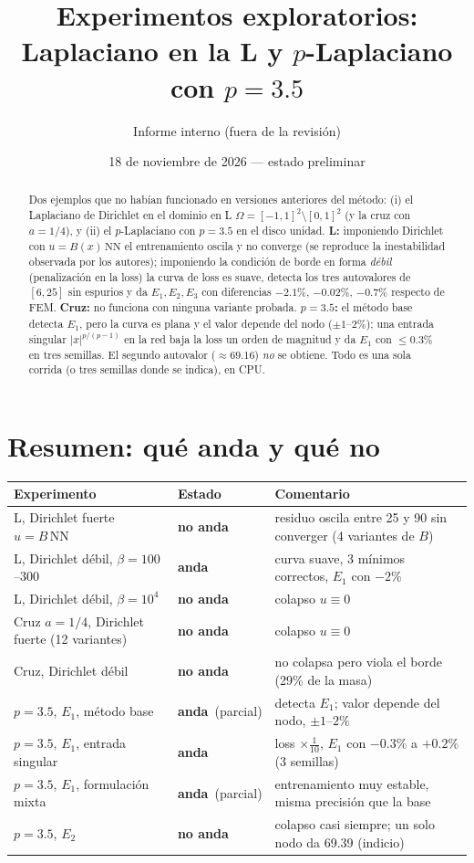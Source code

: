 \documentclass[11pt,a4paper]{article}
\title{Experimentos exploratorios: Laplaciano en la L y $p$-Laplaciano con $p=3.5$}
\author{Informe interno (fuera de la revisión)}
\date{18 de noviembre de 2026 --- estado preliminar}
\newcommand{\ok}{\textcolor{green!50!black}{\textbf{anda}}}
\newcommand{\no}{\textcolor{red!70!black}{\textbf{no anda}}}
\begin{document}
\maketitle

\begin{abstract}
Dos ejemplos que no habían funcionado en versiones anteriores del método: (i) el Laplaciano de Dirichlet en el dominio en L
$\Omega=[-1,1]^2\setminus[0,1]^2$ (y la cruz con $a=1/4$), y (ii) el $p$-Laplaciano con $p=3.5$ en el disco unidad.
\textbf{L:} imponiendo Dirichlet con $u=B(x)\,\mathrm{NN}$ el entrenamiento oscila y no converge (se reproduce la
inestabilidad observada por los autores); imponiendo la condición de borde en forma \emph{débil} (penalización en la loss)
la curva de loss es suave, detecta los tres autovalores de $[6,25]$ sin espurios y da $E_1,E_2,E_3$ con diferencias
$-2.1\%$, $-0.02\%$, $-0.7\%$ respecto de FEM. \textbf{Cruz:} no funciona con ninguna variante probada.
\textbf{$p=3.5$:} el método base detecta $E_1$, pero la curva es plana y el valor depende del nodo
($\pm1$--$2\%$); una entrada singular $|x|^{p/(p-1)}$ en la red baja la loss un orden de magnitud y da $E_1$ con $\le0.3\%$
en tres semillas. El segundo autovalor ($\approx69.16$) \emph{no} se obtiene.
Todo es una sola corrida (o tres semillas donde se indica), en CPU.
\end{abstract}

\section*{Resumen: qué anda y qué no}
\begin{center}
\begin{tabular}{p{6.3cm}p{1.6cm}p{6.6cm}}
\toprule
Experimento & Estado & Comentario\\
\midrule
L, Dirichlet fuerte $u=B\,\mathrm{NN}$ & \no & residuo oscila entre 25 y 90 sin converger (4 variantes de $B$)\\
L, Dirichlet débil, $\beta=100$--$300$ & \ok & curva suave, 3 mínimos correctos, $E_1$ con $-2\%$\\
L, Dirichlet débil, $\beta=10^4$ & \no & colapso $u\equiv0$\\
Cruz $a=1/4$, Dirichlet fuerte (12 variantes) & \no & colapso $u\equiv0$\\
Cruz, Dirichlet débil & \no & no colapsa pero viola el borde (29\% de la masa)\\
$p=3.5$, $E_1$, método base & \ok\ (parcial) & detecta $E_1$; valor depende del nodo, $\pm1$--$2\%$\\
$p=3.5$, $E_1$, entrada singular & \ok & loss $\times\frac1{10}$, $E_1$ con $-0.3\%$ a $+0.2\%$ (3 semillas)\\
$p=3.5$, $E_1$, formulación mixta & \ok\ (parcial) & entrenamiento muy estable, misma precisión que la base\\
$p=3.5$, $E_2$ & \no & colapso casi siempre; un solo nodo da 69.39 (indicio)\\
\bottomrule
\end{tabular}
\end{center}
\end{document}
